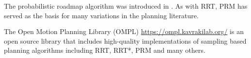 The probabilistic roadmap algorithm was introduced in
\parencite{kavraki96}. As with RRT, PRM has served as the basis for
many variations in the planning literature.

The Open Motion Planning Library (OMPL)
\url{https://ompl.kavrakilab.org/} is an open source library that
includes high-quality implementations of sampling based planning
algorithms including RRT, RRT*, PRM and many others.

